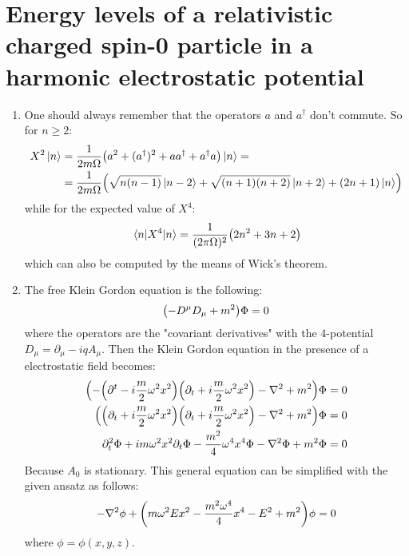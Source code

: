 \documentclass[11pt, oneside]{article}   	%
\begin{document}
\section{Energy levels of a relativistic charged spin-0 particle in a harmonic electrostatic potential}

\begin{enumerate}[label=\alph*)]

\item One should always remember that the operators $a$ and $a^\dagger$ don't commute. So for $n\ge2$:
\begin{align*}
	X^2 \ket{n} &= \frac{1}{2m\Omega} \qty(a^2 + (a^\dagger )^2 + a a^\dagger + a^\dagger a ) \ket{n} =  \\
	&= \frac{1}{2m\Omega} \qty( \sqrt{n(n-1)}\ket{n-2} + \sqrt{(n+1)(n+2)} \ket{n+2} + (2n+1) \ket{n})
\end{align*}
while for the expected value of $X^4$:
\[
	\mel{n}{X^4}{n} =  \frac{1}{(2\pi \Omega)^2} \qty(2n^2 + 3n +2)
\]
which can also be computed by the means of Wick's theorem.

\item The free Klein Gordon equation is the following:
\[
	\qty(- D^\mu D_\mu + m^2) \Phi = 0
\]
where the operators are the "covariant derivatives" with the 4-potential $D_{\mu} = \partial_\mu - iqA_\mu$. Then the Klein Gordon equation in the presence of a electrostatic field becomes:
\begin{align*}
	\qty(-\qty(\partial^t - i \frac{m}{2}\omega^2 x^2) \qty(\partial_t + i\frac{m}{2} \omega^2 x^2) - \laplacian + m^2) \Phi &= 0 \\
	\qty( \qty(\partial_t + i\frac{m}{2} \omega^2 x^2) \qty(\partial_t + i\frac{m}{2} \omega^2 x^2) - \laplacian + m^2 )\Phi &= 0 \\
	\partial^2_t \Phi + i m\omega^2 x^2 \partial_t \Phi - \frac{m^2}{4} \omega^4x^4 \Phi - \laplacian \Phi + m^2 \Phi&= 0
\end{align*}
Because $A_0$ is stationary. This general equation can be simplified with the given ansatz as follows:
\[
	-\laplacian \phi + \qty(m\omega^2 E x^2 - \frac{m^2\omega^4}{4} x^4 - E^2 + m^2)\phi = 0  
\]
where $\phi = \phi(x,y,z)$.


\end{enumerate}
\end{document}
